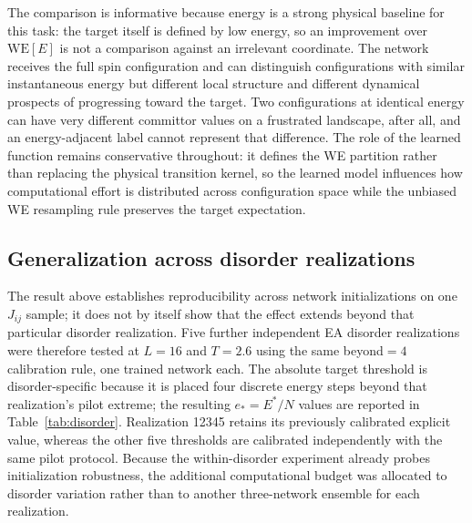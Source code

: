 \documentclass[a4paper,fleqn]{cas-sc}
\newcommand{\WE}{\mathrm{WE}}
\begin{document}
The comparison is informative because energy is a strong physical baseline for this task: the
target itself is defined by low energy, so an improvement over $\WE[E]$ is not a comparison
against an irrelevant coordinate. The network receives the full spin configuration and can
distinguish configurations with similar instantaneous energy but different local structure and
different dynamical prospects of progressing toward the target. Two configurations at
identical energy can have very different committor values on a frustrated landscape, after
all, and an energy-adjacent label cannot represent that difference. The role of the learned
function remains conservative throughout: it defines the WE partition rather than replacing
the physical transition kernel, so the learned model influences how computational effort is
distributed across configuration space while the unbiased WE resampling rule preserves the
target expectation.

\subsection{Generalization across disorder realizations}\label{sec:disordergen}
The result above establishes reproducibility across network initializations on one $J_{ij}$
sample; it does not by itself show that the effect extends beyond that particular disorder
realization. Five further independent EA disorder realizations were therefore tested at
$L=16$ and $T=2.6$ using the same beyond$=4$ calibration rule, one trained network each.  The
absolute target threshold is disorder-specific because it is placed four discrete energy steps
beyond that realization's pilot extreme; the resulting $e_*=E^*/N$ values are reported in
Table~\ref{tab:disorder}.  Realization 12345 retains its previously calibrated explicit value,
whereas the other five thresholds are calibrated independently with the same pilot protocol.
Because the within-disorder experiment already probes initialization robustness, the additional
computational budget was allocated to disorder variation rather than to another three-network
ensemble for each realization.
\end{document}
